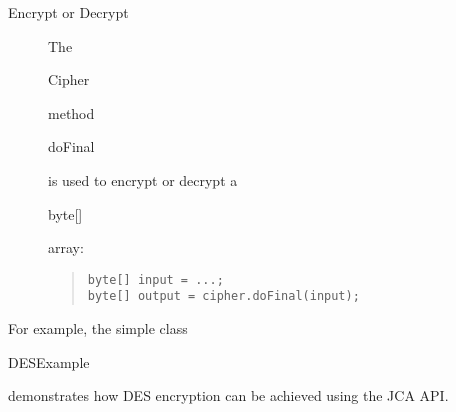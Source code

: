 \begin{description}
  \item[Encrypt or Decrypt]
  The \begin{code}Cipher\end{code} method \begin{code}doFinal\end{code}
  is used to encrypt or decrypt a \begin{code}byte[]\end{code} array:
\begin{quote}\begin{code}\begin{verbatim}
byte[] input = ...;
byte[] output = cipher.doFinal(input);
\end{verbatim}\end{code}\end{quote}
\end{description}

For example, the simple class \begin{code}DESExample\end{code} demonstrates
how DES encryption can be achieved using the JCA API.

